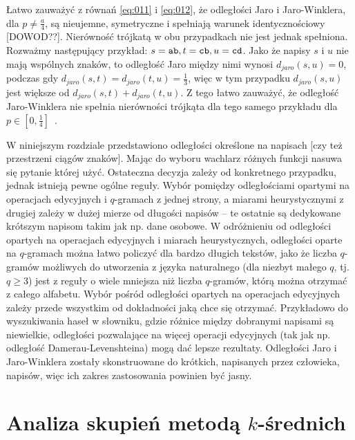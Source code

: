 \documentclass{praca1}
\begin{document}
Łatwo zauważyć z równań \ref{eq:011} i \ref{eq:012}, że odległości Jaro i Jaro-Winklera, dla $p \neq \frac{a}{4}$, są nieujemne,  symetryczne i spełniają warunek identycznościowy [DOWOD??]. Nierówność trójkatą w obu przypadkach nie jest jednak spełniona. Rozważmy następujący przykład: $s = \verb|ab|, t = \verb|cb|, u = \verb|cd|$. Jako że napisy $s$ i $u$ nie mają wspólnych znaków, to odległość Jaro między nimi wynosi $d_{jaro}(s, u) = 0$, podczas gdy $d_{jaro}(s, t) = d_{jaro}(t, u) = \frac{1}{3}$, więc w tym przypadku $d_{jaro}(s, u)$ jest większe od $d_{jaro}(s, t) + d_{jaro}(t, u)$. Z tego łatwo zauważyć, że odległość Jaro-Winklera nie spełnia nierówności trójkąta  dla tego samego przykładu dla $p \in [0, \frac{1}{4}]$~\cite{Loo2014:stringdist}.


W niniejszym rozdziale przedstawiono odległości określone na napisach [czy też przestrzeni ciągów znaków]. Mając do wyboru wachlarz różnych funkcji nasuwa się pytanie której użyć. Ostateczna decyzja zależy od konkretnego przypadku, jednak istnieją pewne ogólne reguły. Wybór pomiędzy odległościami opartymi na operacjach edycyjnych i $q$-gramach z jednej strony, a miarami heurystycznymi z drugiej zależy w dużej mierze od długości napisów -- te ostatnie są dedykowane krótszym napisom takim jak np. dane osobowe. W odróżnieniu od odległości opartych na operacjach edycyjnych i miarach heurystycznych, odległości oparte na $q$-gramach można łatwo policzyć dla bardzo długich tekstów, jako że liczba $q$-gramów możliwych do utworzenia z języka naturalnego (dla niezbyt małego $q$, tj. $q \geq 3$) jest z reguły o wiele mniejsza niż liczba $q$-gramów, którą można otrzymać z całego alfabetu. Wybór pośród odległości opartych na operacjach edycyjnych zależy przede wszystkim od dokładności jaką chce się otrzymać. Przykładowo do wyszukiwania haseł w słowniku, gdzie różnice między dobranymi napisami są niewielkie, odległości pozwalające na więcej operacji edycyjnych (tak jak np. odległość Damerau-Levenshteina) mogą dać lepsze rezultaty. Odległości Jaro i Jaro-Winklera zostały skonstruowane do krótkich, napisanych przez człowieka, napisów, więc ich zakres zastosowania powinien być jasny.


\chapter{Analiza skupień metodą $k$-średnich}
\label{analiza-skupien}
\end{document}

